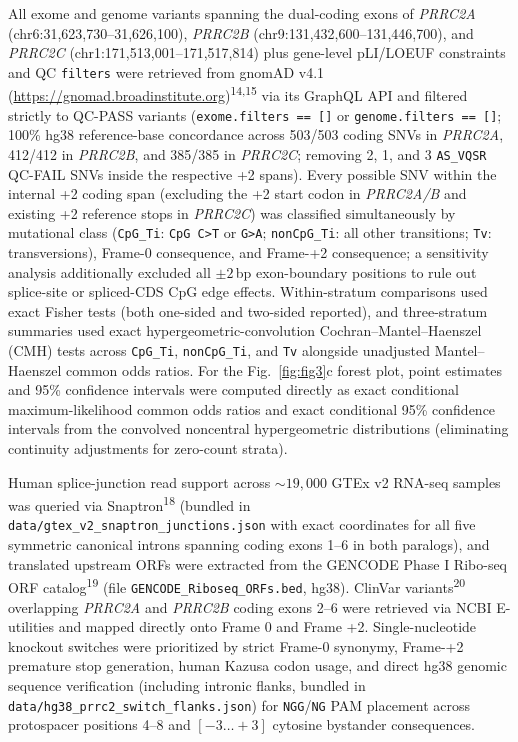 \documentclass[10pt,letterpaper]{article}
\newcommand{\gene}[1]{\textit{#1}}
\newcommand{\refsup}[1]{\textsuperscript{#1}}
\begin{document}
All exome and genome variants spanning the dual-coding exons of \gene{PRRC2A} (chr6:31,623,730--31,626,100), \gene{PRRC2B} (chr9:131,432,600--131,446,700), and \gene{PRRC2C} (chr1:171,513,001--171,517,814) plus gene-level pLI/LOEUF constraints and QC \texttt{filters} were retrieved from gnomAD v4.1 (\url{https://gnomad.broadinstitute.org})\refsup{14,15} via its GraphQL API and filtered strictly to QC-PASS variants (\texttt{exome.filters == []} or \texttt{genome.filters == []}; 100\% hg38 reference-base concordance across 503/503 coding SNVs in \gene{PRRC2A}, 412/412 in \gene{PRRC2B}, and 385/385 in \gene{PRRC2C}; removing 2, 1, and 3 \texttt{AS\_VQSR} QC-FAIL SNVs inside the respective +2 spans). Every possible SNV within the internal +2 coding span (excluding the +2 start codon in \gene{PRRC2A/B} and existing +2 reference stops in \gene{PRRC2C}) was classified simultaneously by mutational class (\texttt{CpG\_Ti}: \texttt{CpG C>T} or \texttt{G>A}; \texttt{nonCpG\_Ti}: all other transitions; \texttt{Tv}: transversions), Frame-0 consequence, and Frame-+2 consequence; a sensitivity analysis additionally excluded all $\pm 2$\,bp exon-boundary positions to rule out splice-site or spliced-CDS CpG edge effects. Within-stratum comparisons used exact Fisher tests (both one-sided and two-sided reported), and three-stratum summaries used exact hypergeometric-convolution Cochran--Mantel--Haenszel (CMH) tests across \texttt{CpG\_Ti}, \texttt{nonCpG\_Ti}, and \texttt{Tv} alongside unadjusted Mantel--Haenszel common odds ratios. For the Fig.~\ref{fig:fig3}c forest plot, point estimates and 95\% confidence intervals were computed directly as exact conditional maximum-likelihood common odds ratios and exact conditional 95\% confidence intervals from the convolved noncentral hypergeometric distributions (eliminating continuity adjustments for zero-count strata).

Human splice-junction read support across $\sim 19,000$ GTEx v2 RNA-seq samples was queried via Snaptron\refsup{18} (bundled in \texttt{data/gtex\_v2\_snaptron\_junctions.json} with exact coordinates for all five symmetric canonical introns spanning coding exons 1--6 in both paralogs), and translated upstream ORFs were extracted from the GENCODE Phase I Ribo-seq ORF catalog\refsup{19} (file \texttt{GENCODE\_Riboseq\_ORFs.bed}, hg38). ClinVar variants\refsup{20} overlapping \gene{PRRC2A} and \gene{PRRC2B} coding exons 2--6 were retrieved via NCBI E-utilities and mapped directly onto Frame 0 and Frame +2. Single-nucleotide knockout switches were prioritized by strict Frame-0 synonymy, Frame-+2 premature stop generation, human Kazusa codon usage, and direct hg38 genomic sequence verification (including intronic flanks, bundled in \texttt{data/hg38\_prrc2\_switch\_flanks.json}) for \texttt{NGG}/\texttt{NG} PAM placement across protospacer positions 4--8 and $[-3\ldots+3]$ cytosine bystander consequences.
\end{document}

